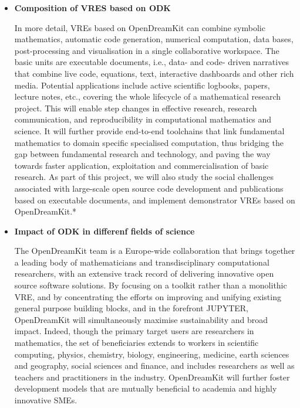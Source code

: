 \documentclass[12pt]{amsbook}
\begin{document}
\begin{itemize}
\item{\textbf{Composition of VRES based on ODK}}

In more detail, VREs based on OpenDreamKit can combine symbolic mathematics, automatic code generation, numerical
computation, data bases, post-processing and visualisation in a single collaborative workspace. The basic units are executable
documents, i.e., data- and code- driven narratives that combine live code, equations, text, interactive dashboards
and other rich media. Potential applications include active scientific logbooks, papers, lecture notes, etc., covering the whole
lifecycle of a mathematical research project.
This will enable step changes in effective research, research communication, and reproducibility in computational mathematics
and science. It will further provide end-to-end toolchains that link fundamental mathematics to domain specific
specialised computation, thus bridging the gap between fundamental research and technology, and paving the way towards
faster application, exploitation and commercialisation of basic research.
As part of this project, we will also study the social challenges associated with large-scale open source code development
and publications based on executable documents, and implement demonstrator VREs based on OpenDreamKit.*


\item{\textbf{Impact of ODK in differenf fields of science}}

The OpenDreamKit team is a Europe-wide collaboration that brings together a leading body of mathematicians and transdisciplinary
computational researchers, with an extensive track record of delivering innovative open source software solutions.
By focusing on a toolkit rather than a monolithic VRE, and by concentrating the efforts on improving and unifying existing
general purpose building blocks, and in the forefront JUPYTER, OpenDreamKit will simultaneously maximise sustainability
and broad impact. Indeed, though the primary target users are researchers in mathematics, the set of beneficiaries extends
to workers in scientific computing, physics, chemistry, biology, engineering, medicine, earth sciences and geography, social
sciences and finance, and includes researchers as well as teachers and practitioners in the industry. OpenDreamKit will
further foster development models that are mutually beneficial to academia and highly innovative SMEs.

\end{itemize}
\end{document}
